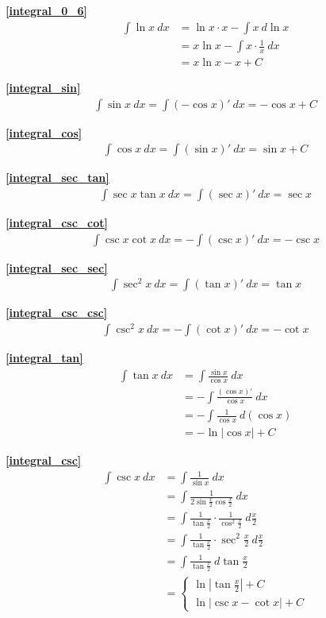 \textbf{\large \ref{integral_0_6}}
\begin{align*}
        \int \ln x\ dx&= \ln x\cdot x-\int x\ d\ln x\\
        &= x\ln x-\int x\cdot \frac{1}{x}\ dx\\
        &=x\ln x- x+C
\end{align*}

\textbf{\large \ref{integral_sin}}
\begin{align*}
        \int \sin x\ dx=\int (-\cos x)'\ dx=-\cos x +C
\end{align*}

\textbf{\large \ref{integral_cos}}
\begin{align*}
        \int \cos x\ dx=\int (\sin x)'\ dx=\sin x+C
\end{align*}

\textbf{\large \ref{integral_sec_tan}}
\begin{align*}
        \int \sec x\tan x\ dx= \int (\sec x)'\ dx= \sec x
\end{align*}

\textbf{\large \ref{integral_csc_cot}}
\begin{align*}
        \int \csc x\cot x\ dx= -\int (\csc x)'\ dx= -\csc x
\end{align*}

\textbf{\large \ref{integral_sec_sec}}
\begin{align*}
        \int \sec^2 x\ dx=\int (\tan x)'\ dx=\tan x
\end{align*}

\textbf{\large \ref{integral_csc_csc}}
\begin{align*}
        \int \csc^2 x\ dx=-\int (\cot x)'\ dx=-\cot x
\end{align*}

\textbf{\large \ref{integral_tan}}
\begin{align*}
        \int \tan x\ dx&=\int \frac{\sin x}{\cos x}\ dx\\
           &=-\int \frac{(\cos x)'}{\cos x}\ dx\\
           &=-\int \frac{1}{\cos x}\ d(\cos x)\\
           &=-\ln\left|\cos x\right|+C
\end{align*}

\textbf{\large \ref{integral_csc}}
\begin{align*}
    \int \csc x\ dx&=\int \frac{1}{\sin x}\ dx\\
    &=\int \frac{1}{2\sin\frac{x}{2}\cos\frac{x}{2}}\ dx\\
    &=\int \frac{1}{\tan \frac{x}{2}}\cdot \frac{1}{\cos^2\frac{x}{2}}\ d\frac{x}{2}\\
    &=\int \frac{1}{\tan \frac{x}{2}}\cdot \sec^2\frac{x}{2}\ d\frac{x}{2}\\
    &=\int \frac{1}{\tan \frac{x}{2}}\ d \tan \frac{x}{2}\\
    &=\begin{cases}
        \ln \left|\tan \frac{x}{2}\right|+C\\
        \ln \left|\csc x - \cot x\right|+C
    \end{cases}
\end{align*}

